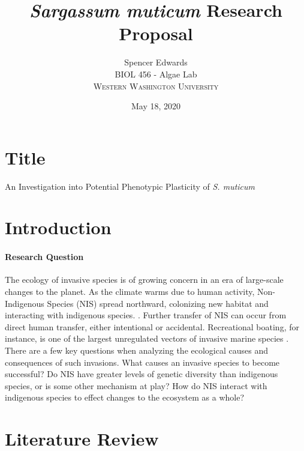 \documentclass[12pt]{extarticle}
\title{\textit{Sargassum muticum} Research Proposal}
\author{Spencer Edwards \\
BIOL 456 - Algae Lab \\
\textsc{Western Washington University}}
\date{May 18, 2020}
\newcommand\x{\textit{S. muticum}}
\begin{document}
\maketitle
\section{Title}
An Investigation into Potential Phenotypic Plasticity of \x\

\section{Introduction}
\paragraph{Research Question}
The ecology of invasive species is of growing concern in an era of large-scale changes to the planet. As the climate warms due to human activity, Non-Indigenous Species (NIS) spread northward, colonizing new habitat and interacting with indigenous species. \cite{de2006northward}. Further transfer of NIS can occur from direct human transfer, either intentional or accidental. Recreational boating, for instance, is one of the largest unregulated vectors of invasive marine species \cite{Murray}. There are a few key questions when analyzing the ecological causes and consequences of such invasions. What causes an invasive species to become successful? Do NIS have greater levels of genetic diversity than indigenous species, or is some other mechanism at play? How do NIS interact with indigenous species to effect changes to the ecosystem as a whole? 
\section{Literature Review}
\end{document}
